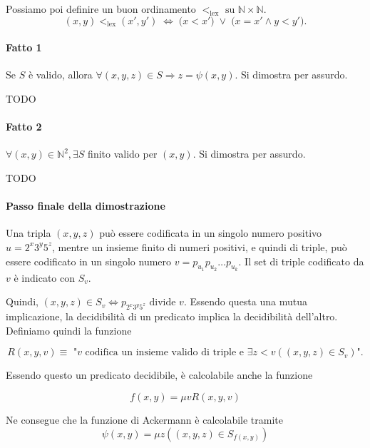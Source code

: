 	Possiamo poi definire un buon ordinamento $<_{\mathrm{lex}} \text{ su } \mathbb{N}\times\mathbb{N}$.
	$$
	(x,y) <_{\mathrm{lex}} (x',y')
	\;\Longleftrightarrow\;
	\big(x < x'\big) \;\vee\; \big(x = x' \land y < y'\big).
	$$
	
	\paragraph{Fatto 1} Se $S$ è valido, allora $\forall (x,y,z) \in S \Rightarrow z = \psi(x,y)$. Si dimostra per assurdo.
	
	{\huge TODO}
	
	\paragraph{Fatto 2} $\forall (x,y) \in \mathbb{N}^2, \exists S$ finito valido per $(x,y)$. Si dimostra per assurdo.
	
	{\huge TODO}
	
	\paragraph{Passo finale della dimostrazione}
	Una tripla $(x,y,z)$ può essere codificata in un singolo numero positivo $u = 2^x3^y5^z$, mentre un insieme finito di numeri positivi, e quindi di triple, può essere codificato in un singolo numero $v = p_{u_1}p_{u_2}\dots p_{u_k}$. Il set di triple codificato da $v$ è indicato con $S_v$.
	 
	Quindi, $(x,y,z) \in S_v \Leftrightarrow p_{2^x3^y5^z} \text{ divide }v$. Essendo questa una mutua implicazione, la decidibilità di un predicato implica la decidibilità dell'altro. Definiamo quindi la funzione
	
	$$
	R(x,y,v) \equiv \text{ "$v$ codifica un insieme valido di triple e $\exists z < v ((x,y,z) \in S_v)$"}.
	$$
	
	Essendo questo un predicato decidibile, è calcolabile anche la funzione
	
	$$
	f(x,y) = \mu v R(x,y,v)
	$$
	
	Ne consegue che la funzione di Ackermann è calcolabile tramite
	$$
	\psi(x,y) = \mu z ((x,y,z) \in S_{f(x,y)})
	$$